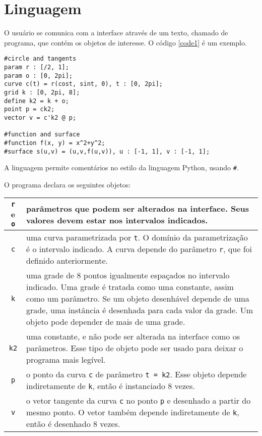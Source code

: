 \chapter{Linguagem}
\label{lang}

O usuário se comunica com a interface através de um texto, chamado de programa,
que contém os objetos de interesse.
O código \ref{code1} é um exemplo.
\begin{lstlisting}[caption=Exemplo de objetos,label=code1]
#circle and tangents
param r : [/2, 1];
param o : [0, 2pi];
curve c(t) = r(cost, sint, 0), t : [0, 2pi];
grid k : [0, 2pi, 8];
define k2 = k + o;
point p = ck2;
vector v = c'k2 @ p;

#function and surface
#function f(x, y) = x^2+y^2;
#surface s(u,v) = (u,v,f(u,v)), u : [-1, 1], v : [-1, 1];
\end{lstlisting}

A linguagem permite comentários no estilo da linguagem Python, usando \texttt{\#}.

O programa declara os seguintes objetos:

\begin{centering}
\begin{tabularx}{\textwidth}{||c|X||}
    \hline
    \texttt{r} e \texttt{o} & parâmetros que podem ser alterados na interface.
    Seus valores devem estar nos intervalos indicados. \\ 

    \hline
    \texttt{c} & uma curva parametrizada por \texttt{t}.
    O domínio da parametrização é o intervalo indicado.
    A curva depende do parâmetro \texttt{r}, que foi definido anteriormente. \\

    \hline
    \texttt{k} & uma grade de 8 pontos igualmente espaçados no intervalo indicado.
    Uma grade é tratada como uma constante, assim como um parâmetro.
    Se um objeto desenhável depende de uma grade, uma instância é desenhada para cada valor da grade.
    Um objeto pode depender de mais de uma grade. \\

    \hline
    \texttt{k2} & uma constante, e não pode ser alterada na interface como os parâmetros.
    Esse tipo de objeto pode ser usado para deixar o programa mais legível. \\
    
    \hline
    \texttt{p} & o ponto da curva \texttt{c} de parâmetro \texttt{t = k2}.
    Esse objeto depende indiretamente de \texttt{k}, então é instanciado 8 vezes. \\
    
    \hline
    \texttt{v} & o vetor tangente da curva \texttt{c} no ponto \texttt{p} 
    e desenhado a partir do mesmo ponto.
    O vetor também depende indiretamente de \texttt{k}, então é desenhado 8 vezes. \\
    \hline
\end{tabularx}
\end{centering}

